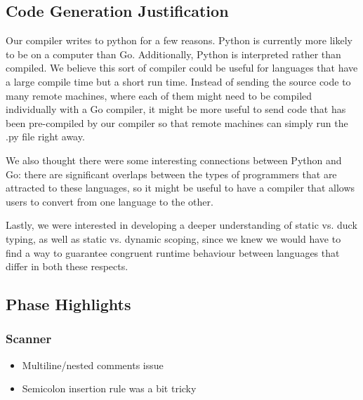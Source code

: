 \documentclass{article}
\begin{document}
\subsection{Code Generation Justification}
Our compiler writes to python for a few reasons. Python is currently more likely to be on a computer than Go. Additionally, Python is interpreted rather than compiled. We believe this sort of compiler could be useful for languages that have a large compile time but a short run time. Instead of sending the source code to many remote machines, where each of them might need to be compiled individually with a Go compiler, it might be more useful to send code that has been pre-compiled by our compiler so that remote machines can simply run the .py file right away.

We also thought there were some interesting connections between Python and Go: there are significant overlaps between the types of programmers that are attracted to these languages, so it might be useful to have a compiler that allows users to convert from one language to the other. 

Lastly, we were interested in developing a deeper understanding of static vs. duck typing, as well as static vs. dynamic scoping, since we knew we would have to find a way to guarantee congruent runtime behaviour between languages that differ in both these respects.
	
\subsection{Phase Highlights}

\subsubsection{Scanner}
\begin{itemize}
\item Multiline/nested comments issue
\item Semicolon insertion rule was a bit tricky
\end{itemize}
\end{document}
